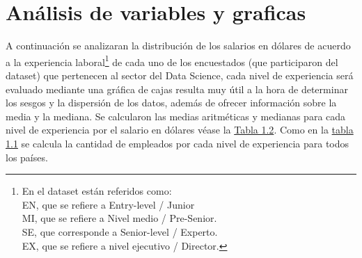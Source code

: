\documentclass{article}
\begin{document}
	\section{Análisis de variables y graficas}
	A continuación se analizaran la distribución de los salarios en dólares de acuerdo a la experiencia laboral\footnote{En el dataset están referidos como:
		\\EN, que se refiere a Entry-level / Junior
		\\MI, que se refiere a Nivel medio / Pre-Senior.
		\\SE, que corresponde a Senior-level / Experto.
		\\EX, que se refiere a nivel ejecutivo / Director.} de cada uno de los encuestados (que participaron del dataset) que pertenecen al sector del Data Science, cada nivel de experiencia será evaluado mediante una gráfica de cajas resulta muy útil a la hora de determinar los sesgos y la dispersión de los datos, además de ofrecer información sobre la media y la mediana. Se calcularon las medias aritméticas y medianas para cada nivel de experiencia por el salario en dólares véase la \hyperref[tabla 1.2]{Tabla 1.2}. Como en la \hyperref[tabla 1.1]{tabla 1.1} se calcula la cantidad de empleados por cada nivel de experiencia para todos los países.
	
\end{document}
